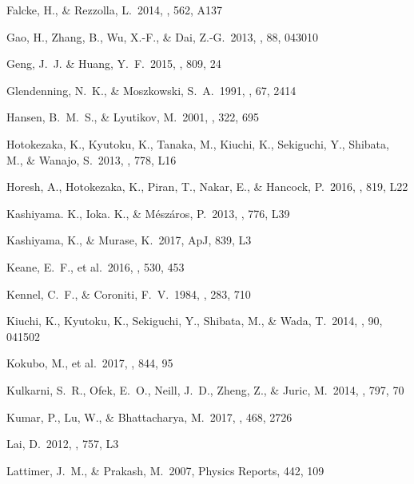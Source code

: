 \documentclass[]{pasj01}
\begin{document}
\begin{thebibliography}{10}
{Falcke}, H., \& {Rezzolla}, L.\ 2014, \apj, 562, A137

{Gao}, H., {Zhang}, B., {Wu}, X.-F., \& {Dai}, Z.-G.\ 2013, \prd, 88, 043010

{Geng}, J.~J. \& {Huang}, Y.~F.\ 2015, \apj, 809, 24

Glendenning, N.~K., \& Moszkowski, S.~A.\ 1991, \prl, 67, 2414

{Hansen}, B.~M.~S., \& {Lyutikov}, M.\ 2001, \mnras, 322, 695

{Hotokezaka}, K., {Kyutoku}, K., {Tanaka}, M., {Kiuchi}, K., {Sekiguchi}, Y., {Shibata}, M., \& {Wanajo}, S.\ 2013, \aplett, 778, L16

{Horesh}, A., {Hotokezaka}, K., {Piran}, T., {Nakar}, E., \& {Hancock}, P.\ 2016, \aplett, 819, L22

{Kashiyama}. K., {Ioka}. K., \& {M{\'e}sz{\'a}ros}, P.\ 2013, \aplett, 776, L39

{Kashiyama}, K., \& {Murase}, K.\ 2017, ApJ, 839, L3

{Keane}, E.~F., et al.\ 2016, \nat, 530, 453

{Kennel}, C.~F., \& {Coroniti}, F.~V.\ 1984, \apj, 283, 710 

{Kiuchi}, K., {Kyutoku}, K., {Sekiguchi}, Y., {Shibata}, M., \& {Wada}, T.\ 2014, \prd, 90, 041502

{Kokubo}, M., et al.\ 2017, \apj, 844, 95 

{Kulkarni}, S.~R., {Ofek}, E.~O., {Neill}, J.~D., {Zheng}, Z., \& {Juric}, M.\ 2014, \apj, 797, 70

Kumar, P., Lu, W., \& Bhattacharya, M.\ 2017, \mnras, 468, 2726

Lai, D.\ 2012, \apj, 757, L3

{Lattimer}, J.~M., \& {Prakash}, M.\ 2007, Physics Reports, 442, 109


\end{thebibliography}
\end{document}
